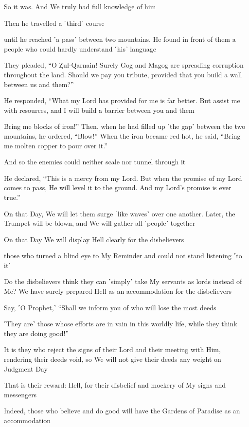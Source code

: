 So it was. And We truly had full knowledge of him

Then he travelled a ˹third˺ course

until he reached ˹a pass˺ between two mountains. He found in front of them a people who could hardly understand ˹his˺ language

They pleaded, “O Ⱬul-Qarnain! Surely Gog and Magog are spreading corruption throughout the land. Should we pay you tribute, provided that you build a wall between us and them?”

He responded, “What my Lord has provided for me is far better. But assist me with resources, and I will build a barrier between you and them

Bring me blocks of iron!” Then, when he had filled up ˹the gap˺ between the two mountains, he ordered, “Blow!” When the iron became red hot, he said, “Bring me molten copper to pour over it.”

And so the enemies could neither scale nor tunnel through it

He declared, “This is a mercy from my Lord. But when the promise of my Lord comes to pass, He will level it to the ground. And my Lord’s promise is ever true.”

On that Day, We will let them surge ˹like waves˺ over one another. Later, the Trumpet will be blown, and We will gather all ˹people˺ together

On that Day We will display Hell clearly for the disbelievers

those who turned a blind eye to My Reminder and could not stand listening ˹to it˺

Do the disbelievers think they can ˹simply˺ take My servants as lords instead of Me? We have surely prepared Hell as an accommodation for the disbelievers

Say, ˹O Prophet,˺ “Shall we inform you of who will lose the most deeds

˹They are˺ those whose efforts are in vain in this worldly life, while they think they are doing good!”

It is they who reject the signs of their Lord and their meeting with Him, rendering their deeds void, so We will not give their deeds any weight on Judgment Day

That is their reward: Hell, for their disbelief and mockery of My signs and messengers

Indeed, those who believe and do good will have the Gardens of Paradise as an accommodation

